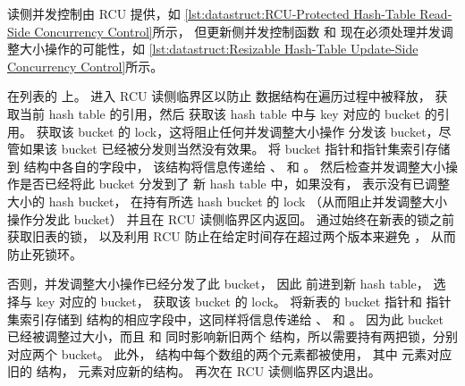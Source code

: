 \begin{listing}

\caption{可调整大小的 Hash-Table 更新侧并发控制}
\label{lst:datastruct:Resizable Hash-Table Update-Side Concurrency Control}
\end{listing}

读侧并发控制由 RCU 提供，如
\cref{lst:datastruct:RCU-Protected Hash-Table Read-Side Concurrency Control}所示，
但更新侧并发控制函数
 和 
现在必须处理并发调整大小操作的可能性，如
\cref{lst:datastruct:Resizable Hash-Table Update-Side Concurrency Control}所示。

\begin{fcvref}
 在列表的  上。
 进入 RCU 读侧临界区以防止
数据结构在遍历过程中被释放，
 获取当前 hash table 的引用，然后
 获取该 hash table 中与 key 对应的 bucket 的引用。
 获取该 bucket 的 lock，这将阻止任何并发调整大小操作
分发该 bucket，尽管如果该 bucket 已经被分发则当然没有效果。
 将 bucket 指针和指针集索引存储到
 结构中各自的字段中，
该结构将信息传递给 、 和
。
 然后检查并发调整大小操作是否已经将此 bucket 分发到了
新 hash table 中，如果没有， 表示没有已调整大小的 hash bucket，
 在持有所选 hash bucket 的 lock
（从而阻止并发调整大小操作分发此 bucket）
并且在 RCU 读侧临界区内返回。
通过始终在新表的锁之前获取旧表的锁，
以及利用 RCU 防止在给定时间存在超过两个版本来避免 ，
从而防止死锁环。

否则，并发调整大小操作已经分发了此 bucket，
因此  前进到新 hash table，
 选择与 key 对应的 bucket，
 获取该 bucket 的 lock。
 将新表的 bucket 指针和
指针集索引存储到
 结构的相应字段中，这同样将信息传递给
、 和 。
因为此 bucket 已经被调整过大小，而且
 和  同时影响新旧两个
 结构，所以需要持有两把锁，分别对应两个 bucket。
此外， 结构中每个数组的两个元素都被使用，
其中 \co{[0]} 元素对应旧的  结构，
\co{[1]} 元素对应新的结构。
 再次在 RCU 读侧临界区内退出。
\end{fcvref}

